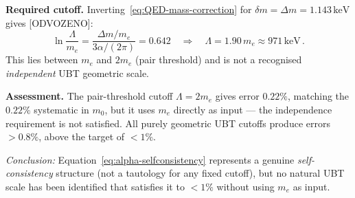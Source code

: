 \noindent\textbf{Required cutoff.}
Inverting~\eqref{eq:QED-mass-correction} for $\delta m = \Delta m = 1.143\,\text{keV}$ gives [ODVOZENO]:
\begin{equation}
  \ln\!\frac{\Lambda}{m_e} = \frac{\Delta m/m_e}{3\alpha/(2\pi)} = 0.642
  \quad\Rightarrow\quad \Lambda = 1.90\,m_e \approx 971\,\text{keV}\,.
\end{equation}
This lies between $m_e$ and $2m_e$ (pair threshold) and is not a recognised \emph{independent} UBT geometric scale.

\medskip
\noindent\textbf{Assessment.}
The pair-threshold cutoff $\Lambda=2m_e$ gives error $0.22\%$, matching the $0.22\%$ systematic in $m_0$, but it uses $m_e$ directly as input — the independence requirement is not satisfied.  All purely geometric UBT cutoffs produce errors $>0.8\%$, above the target of $<1\%$.

\emph{Conclusion:} Equation~\eqref{eq:alpha-selfconsistency} represents a genuine \emph{self-consistency} structure (not a tautology for any fixed cutoff), but no natural UBT scale has been identified that satisfies it to $<1\%$ without using $m_e$ as input.

\begin{center}
\end{center}
